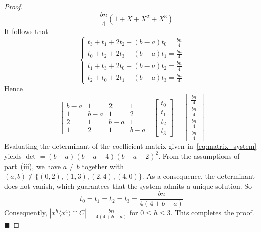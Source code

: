 \documentclass[12pt]{article}
\begin{document}
\begin{proof}
\[=
\frac{bn}{4}(1 + X + X^2 + X^3)
\]
It follows that
 \[
 \begin{cases}
 	 t_3 + t_1 + 2t_2 +(b-a) t_0 =
 	 \frac{bn}{4} \\[1ex]
 	t_0 + t_2 + 2 t_3 + (b-a) t_1 = \frac{bn}{4} \\[1ex]
 	t_1 + t_3 + 2 t_0 + (b-a)t_2 = \frac{bn}{4} \\[1ex]
 	t_2 + t_0 + 2t_1 + (b-a)t_3 = \frac{bn}{4}
 \end{cases}
 \]
 Hence
 \begin{equation}\label{eq:matrix_system}
 	\begin{bmatrix}
 		b-a & 1 & 2 & 1 \\
 		1 & b-a & 1 & 2 \\
 		2 & 1 & b-a & 1 \\
 		1 & 2 & 1 & b-a
 	\end{bmatrix}
 	\begin{bmatrix}
 		t_0 \\
 		t_1 \\
 		t_2 \\
 		t_3
 	\end{bmatrix}
 	=
 	\begin{bmatrix}
 		\frac{bn}{4} \\[1.5ex]
 		\frac{bn}{4} \\[1.5ex]
 		\frac{bn}{4} \\[1.5ex]
 		\frac{bn}{4}
 	\end{bmatrix}
 \end{equation}
 Evaluating the determinant of the coefficient matrix given in~\eqref{eq:matrix_system} yields $\det=(b-a)(b-a+4)(b-a-2)^2$. From the assumptions of part~(iii), we have $a\neq b$ together with $(a,b)\notin\{(0,2), (1,3), (2,4), (4,0)\}$. As a consequence, the determinant does not vanish, which guarantees that the system admits a unique solution. So
  \[
 t_0 = t_1 = t_2 = t_3 = \frac{bn}{4(4+b-a)}
 \]
 Consequently,
 $
 \left|x^{h}\langle x^{4}\rangle\cap C\right|
 =\frac{bn}{4(4+b-a)}$
 for $0\le h\le3.$ This completes the proof.
 \hfill$\blacksquare$
  	  	\end{proof}
\end{document}
